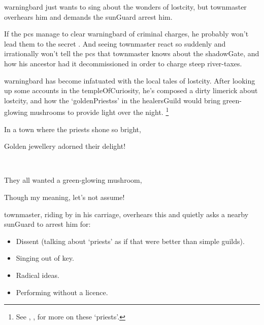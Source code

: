 \Gls{warningbard} just wants to sing about the wonders of \gls{lostcity}, but \gls{townmaster} overhears him and demands the \gls{sunGuard} arrest him.

If the \glspl{pc} manage to clear \gls{warningbard} of criminal charges, he probably won't lead them to the secret .
And seeing \gls{townmaster} react so suddenly and irrationally won't tell the \glspl{pc} that \gls{townmaster} knows about the \gls{shadowGate}, and how his ancestor had it decommissioned in order to charge steep river-taxes.

\begin{exampletext}
  \Gls{warningbard} has become infatuated with the local tales of \gls{lostcity}.
  After looking up some accounts in the \gls{templeOfCuriosity}, he's composed a dirty limerick about \gls{lostcity}, and how the `\glspl{goldenPriests}' in the \gls{healersGuild} would bring green-glowing mushrooms to provide light over the night.%
  \footnote{See , , for more on these `priests'.}
\end{exampletext}

\begin{speechtext}
  In a town where the priests shone so bright,
  \textcolor{\pageSideColor}{\eighthnote~\raisebox{3pt}{\twonotes}}

  \noindent
  Golden jewellery adorned their delight!
  \textcolor{\pageSideColor}{\quarternote\raisebox{-4pt}{\eighthnote~}\eighthnote}

  \textcolor{\pageSideColor}{\twonotes~\raisebox{-12pt}{\twonotes}}

  \noindent
  They all wanted a green-glowing mushroom,
  \textcolor{\pageSideColor}{\eighthnote~\raisebox{2pt}{\quarternote}}

  \noindent
  Though my meaning, let's not assume!
  \textcolor{\pageSideColor}{\eighthnote~\raisebox{-7pt}{\quarternote}}

\end{speechtext}

\Gls{townmaster}, riding by in his carriage, overhears this and quietly asks a nearby \gls{sunGuard} to arrest him for:

\begin{itemize}%
  \item
  Dissent (talking about `priests' as if that were better than simple guilds).
  \item
  Singing out of key.
  \item
  Radical ideas.
  \item
  Performing without a licence.%
\end{itemize}

